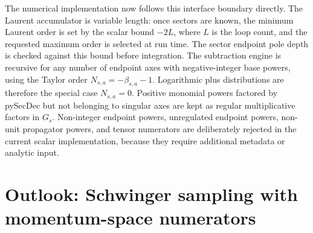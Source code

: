 \documentclass[11pt]{article}
\begin{document}
The numerical implementation now follows this interface boundary directly.
The Laurent accumulator is variable length: once sectors are known, the
minimum Laurent order is set by the scalar bound \(-2L\), where \(L\) is the
loop count, and the requested maximum order is selected at run time.  The
sector endpoint pole depth is checked against this bound before integration.
The subtraction engine is
recursive for any number of endpoint axes with negative-integer base powers,
using the Taylor order \(N_{s,a}=-\beta_{s,a}-1\).  Logarithmic plus
distributions are therefore the special case \(N_{s,a}=0\).  Positive
monomial powers factored by pySecDec but not belonging to singular axes are
kept as regular multiplicative factors in \(G_s\).  Non-integer endpoint
powers, unregulated endpoint powers, non-unit propagator powers, and tensor
numerators are deliberately rejected in the current scalar implementation,
because they require additional metadata or analytic input.

\section{Outlook: Schwinger sampling with momentum-space numerators}
\end{document}
